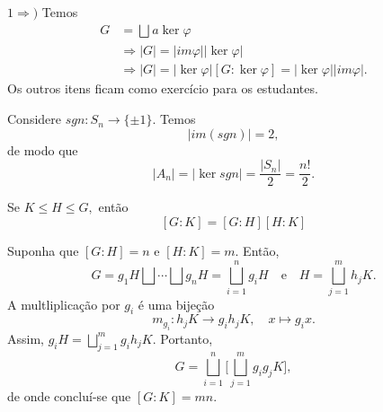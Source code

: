 \documentclass[algebra_notes.tex]{subfiles}
\begin{document}
\begin{proof*}
	$1\Rightarrow)$ Temos
	\begin{align*}
		G & = \bigsqcup_{}^{}{a\ker{\varphi}}                                              \\
		  & \Rightarrow |G| = |im\varphi||\ker{\varphi}|                                   \\
		  & \Rightarrow |G| = |\ker\varphi|[G:\ker{\varphi}] = |\ker{\varphi}||im\varphi|.
	\end{align*}
	Os outros itens ficam como exercício para os estudantes. \qedsymbol
\end{proof*}
\begin{example*}
	Considere $sgn:S_{n}\rightarrow \{\pm 1\}.$ Temos
	$$
		|im(sgn)| = 2,
	$$
	de modo que
	$$
		|A_{n}| = |\ker{sgn}| = \frac{|S_{n}|}{2} = \frac{n!}{2}.
	$$
\end{example*}
\begin{prop*}
	Se $K\leq{H}\leq{G},$ então
	$$
		[G:K] = [G:H][H:K]
	$$
\end{prop*}
\begin{proof*}
	Suponha que $[G:H] = n$ e $[H:K]=m$. Então,
	$$
		G = g_{1}H\bigsqcup_{}^{}{\cdots}\bigsqcup_{}^{}{g_{n}H} = \bigsqcup_{i=1}^{n}{g_{i}H}\quad\text{e}\quad H = \bigsqcup_{j=1}^{m}{h_{j}K}.
	$$
	A multliplicação por $g_{i}$ é uma bijeção
	$$
		m_{g_{i}}:h_{j}K\rightarrow g_{i}h_{j}K,\quad x\mapsto g_{i}x.
	$$
	Assim, $g_{i}H = \bigsqcup_{j=1}^{m}{g_{i}h_{j}K}.$ Portanto,
	$$
		G = \bigsqcup_{i=1}^{n}{\biggl[\bigsqcup_{j=1}^{m}{g_{i}g_{j}K}\biggr]},
	$$
	de onde concluí-se que $[G:K]=mn.$ \qedsymbol
\end{proof*}
\end{document}
